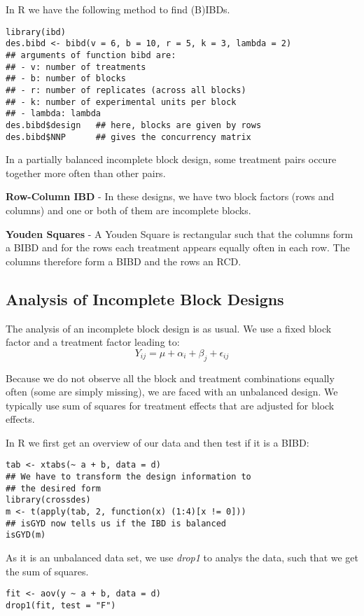 In R we have the following method to find (B)IBDs.
\begin{lstlisting}
library(ibd)
des.bibd <- bibd(v = 6, b = 10, r = 5, k = 3, lambda = 2) 
## arguments of function bibd are:
## - v: number of treatments
## - b: number of blocks
## - r: number of replicates (across all blocks)
## - k: number of experimental units per block
## - lambda: lambda
des.bibd$design   ## here, blocks are given by rows
des.bibd$NNP      ## gives the concurrency matrix
\end{lstlisting}

In a partially balanced incomplete block design, some treatment pairs occure together more often than other pairs.\medskip

\textbf{Row-Column IBD} - In these designs, we have two block factors (rows and columns) and one or both of them are incomplete blocks. \medskip

\textbf{Youden Squares} - A Youden Square is rectangular such that the columns form a BIBD and for the rows each treatment appears equally often in each row. The columns therefore form a BIBD and the rows an RCD.


\subsection{Analysis of Incomplete Block Designs} 

The analysis of an incomplete block design is as usual. We use a fixed block factor and a treatment factor leading to:
$$Y_{ij} = \mu + \alpha_i + \beta_j + \epsilon_{ij}$$

Because we do not observe all the block and treatment combinations equally often (some are simply missing), we are faced with an unbalanced design. We typically use sum of squares for treatment effects that are adjusted for block effects.\medskip

In R we first get an overview of our data and then test if it is a BIBD:
\begin{lstlisting}
tab <- xtabs(~ a + b, data = d)
## We have to transform the design information to 
## the desired form
library(crossdes)
m <- t(apply(tab, 2, function(x) (1:4)[x != 0]))
## isGYD now tells us if the IBD is balanced
isGYD(m)
\end{lstlisting}

As it is an unbalanced data set, we use \textit{drop1} to analys the data, such that we get the sum of squares.
\begin{lstlisting}
fit <- aov(y ~ a + b, data = d)
drop1(fit, test = "F")
\end{lstlisting}


